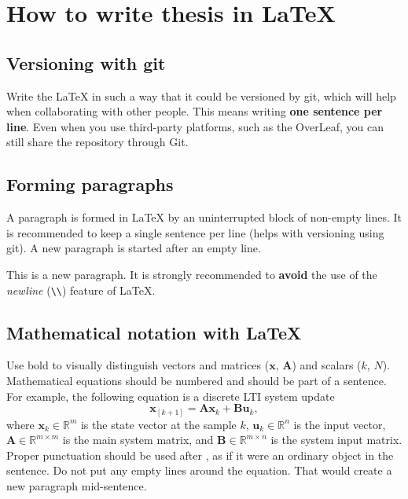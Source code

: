 
\chapter{How to write thesis in LaTeX\label{chap:how_to}}

\section{Versioning with git}

Write the LaTeX in such a way that it could be versioned by git, which will help when collaborating with other people.
This means writing \textbf{one sentence per line}.
Even when you use third-party platforms, such as the OverLeaf, you can still share the repository through Git.

\section{Forming paragraphs}

A paragraph is formed in LaTeX by an uninterrupted block of non-empty lines.
It is recommended to keep a single sentence per line (helps with versioning using git).
A new paragraph is started after an empty line.

This is a new paragraph. It is strongly recommended to \textbf{avoid} the use of the \emph{newline} (\texttt{\textbackslash\textbackslash}) feature of LaTeX.

\section{Mathematical notation with LaTeX}

Use bold to visually distinguish vectors and matrices ($\mathbf{x}$, $\mathbf{A}$) and scalars ($k$, $N$).
Mathematical equations should be numbered and should be part of a sentence.
For example, the following equation is a discrete LTI system update
\begin{equation}
  \mathbf{x}_{\left[k+1\right]} = \mathbf{A}\mathbf{x}_k + \mathbf{B}\mathbf{u}_k,
  \label{eq:lti_system}
\end{equation}
where $\mathbf{x}_k \in \mathbb{R}^m$ is the state vector at the sample $k$, $\mathbf{u}_k \in \mathbb{R}^n$ is the input vector, $\mathbf{A} \in \mathbb{R}^{m \times m}$ is the main system matrix, and $\mathbf{B} \in \mathbb{R}^{m \times n}$ is the system input matrix.
Proper punctuation should be used after , as if it were an ordinary object in the sentence.
Do not put any empty lines around the equation.
That would create a new paragraph mid-sentence.

